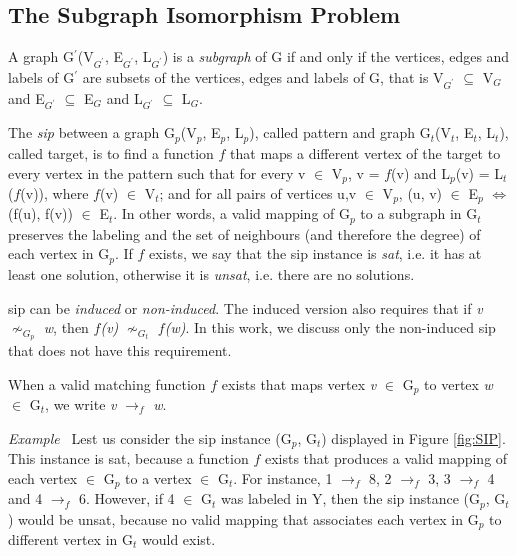 \documentclass{l4proj}
\newcounter{example}[section]
\newenvironment{example}[1][]{\refstepcounter{example}\par\medskip
   \noindent \textit{Example~\theexample #1} \rmfamily}{\medskip}
\begin{document}
\subsection{The Subgraph Isomorphism Problem}

A graph G$^{\prime}$(V$_{G^{\prime}}$, E$_{G^{\prime}}$, L$_{G^{\prime}}$) is a \textit{subgraph} of G if and only if the vertices, edges and labels of G$^{\prime}$ are subsets of the vertices, edges and labels of G, that is V$_{G^{\prime}}$ $\subseteq$ V$_{G}$ and E$_{G^{\prime}}$ $\subseteq$ E$_{G}$ and L$_{G^{\prime}}$ $\subseteq$ L$_{G}$.

The \emph{\gls{sip}} between a graph G$_{p}$(V$_{p}$, E$_{p}$, L$_{p}$), called pattern and graph G$_{t}$(V$_{t}$, E$_{t}$, L$_{t}$), called target, is to find a function $f$ that maps a different vertex of the target to every vertex in the pattern such that for every v $\in$ V$_{p}$, v = $f$(v) and L$_{p}$(v) = L$_{t}$($f$(v)), where $f$(v) $\in$ V$_{t}$; and for all pairs of vertices u,v $\in$ V$_{p}$, (u, v) $\in$ E$_{p}$ $\Leftrightarrow$ (f(u), f(v)) $\in$ E$_{t}$. In other words, a valid mapping of G$_{p}$ to a subgraph in G$_{t}$ preserves the labeling and the set of neighbours (and therefore the degree) of each vertex in G$_{p}$. If $f$ exists, we say that the \gls{sip} instance is \emph{\gls{sat}}, i.e. it has at least one solution, otherwise it is \emph{\gls{unsat}}, i.e. there are no solutions.

\gls{sip} can be \emph{induced} or \emph{non-induced}. The induced version also requires that if \emph{v} $\nsim_{G_{p}}$ \emph{w}, then \emph{$f$(v)} $\nsim_{G_{t}}$ \emph{$f$(w)}. In this work, we discuss only the non-induced \gls{sip} that does not have this requirement.

When a valid matching function $f$ exists that maps vertex \emph{v} $\in$ G$_{p}$ to vertex \emph{w} $\in$ G$_{t}$, we write \emph{v} $\rightarrow_{f}$ \emph{w}. 

\begin{example}
Lest us consider the \gls{sip} instance (G$_{p}$, G$_{t}$) displayed in Figure \ref{fig:SIP}. This instance is \gls{sat}, because a function $f$ exists that produces a valid mapping of each vertex $\in$ G$_{p}$ to a vertex $\in$ G$_{t}$. For instance, 1 $\rightarrow_{f}$ 8, 2 $\rightarrow_{f}$ 3, 3 $\rightarrow_{f}$ 4 and 4 $\rightarrow_{f}$ 6. However, if 4 $\in$ G$_{t}$ was labeled in Y, then the \gls{sip} instance (G$_{p}$, G$_{t}$) would be \gls{unsat}, because no valid mapping that associates each vertex in G$_{p}$ to different vertex in G$_{t}$ would exist.
\end{example}
\end{document}
